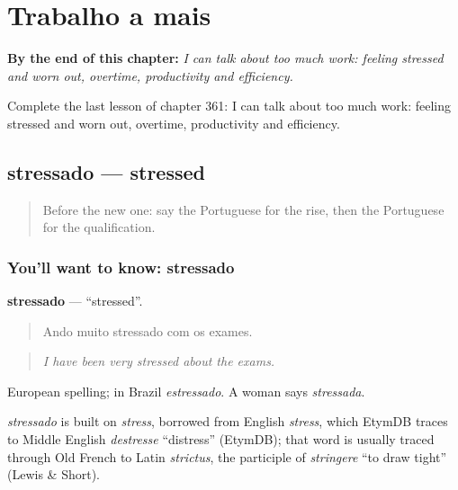 
\chapter{Trabalho a mais}
\label{ch:pt-trabalho-a-mais}

\begin{chapteropening}
\textbf{By the end of this chapter:} \emph{I can talk about too much work: feeling stressed and worn out, overtime, productivity and efficiency.}

Complete the last lesson of chapter 361: I can talk about too much work: feeling stressed and worn out, overtime, productivity and efficiency.
\end{chapteropening}

\section[stressado]{stressado — stressed}

\label{lesson:PT-C361-stressado}



\begin{quote}
Before the new one: say the Portuguese for the rise, then the Portuguese for the qualification.
\end{quote}

\subsection*{You'll want to know: stressado}
\textbf{stressado} — \textquotedblleft{}stressed\textquotedblright{}.

\begin{quote}
Ando muito stressado com os exames.
\end{quote}

\begin{quote}
\emph{I have been very stressed about the exams.}
\end{quote}

European spelling; in Brazil \emph{estressado}. A woman says \emph{stressada}.

\begin{cousinweb}
\emph{stressado} is built on \emph{stress}, borrowed from English \emph{stress}, which EtymDB traces to Middle English \emph{destresse} \textquotedblleft{}distress\textquotedblright{} (EtymDB); that word is usually traced through Old French to Latin \emph{strictus}, the participle of \emph{stringere} \textquotedblleft{}to draw tight\textquotedblright{} (Lewis \& Short).
\end{cousinweb}

